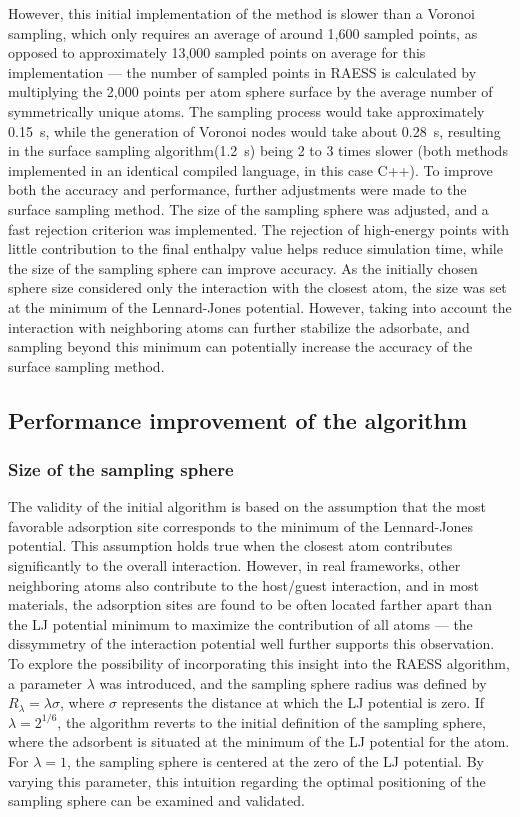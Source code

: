 \documentclass[main]{subfiles}
\begin{document}
However, this initial implementation of the method is slower than a Voronoi sampling, which only requires an average of around 1,600 sampled points, as opposed to approximately 13,000 sampled points on average for this implementation --- the number of sampled points in RAESS is calculated by multiplying the 2,000 points per atom sphere surface by the average number of symmetrically unique atoms. The sampling process would take approximately \SI{0.15}{\second}, while the generation of Voronoi nodes would take about \SI{0.28}{\second}, resulting in the surface sampling algorithm(\SI{1.2}{\second}) being 2 to 3 times slower (both methods implemented in an identical compiled language, in this case C++). To improve both the accuracy and performance, further adjustments were made to the surface sampling method. The size of the sampling sphere was adjusted, and a fast rejection criterion was implemented. The rejection of high-energy points with little contribution to the final enthalpy value helps reduce simulation time, while the size of the sampling sphere can improve accuracy. As the initially chosen sphere size considered only the interaction with the closest atom, the size was set at the minimum of the Lennard-Jones potential. However, taking into account the interaction with neighboring atoms can further stabilize the adsorbate, and sampling beyond this minimum can potentially increase the accuracy of the surface sampling method.

\subsection{Performance improvement of the algorithm}

\subsubsection{Size of the sampling sphere}

The validity of the initial algorithm is based on the assumption that the most favorable adsorption site corresponds to the minimum of the Lennard-Jones potential. This assumption holds true when the closest atom contributes significantly to the overall interaction. However, in real frameworks, other neighboring atoms also contribute to the host/guest interaction, and in most materials, the adsorption sites are found to be often located farther apart than the LJ potential minimum to maximize the contribution of all atoms --- the dissymmetry of the interaction potential well further supports this observation. To explore the possibility of incorporating this insight into the RAESS algorithm, a parameter $\lambda$ was introduced, and the sampling sphere radius was defined by $R_{\lambda} = \lambda \sigma$, where $\sigma$ represents the distance at which the LJ potential is zero. If $\lambda=2^{1/6}$, the algorithm reverts to the initial definition of the sampling sphere, where the adsorbent is situated at the minimum of the LJ potential for the atom. For $\lambda=1$, the sampling sphere is centered at the zero of the LJ potential. By varying this parameter, this intuition regarding the optimal positioning of the sampling sphere can be examined and validated.
\end{document}
